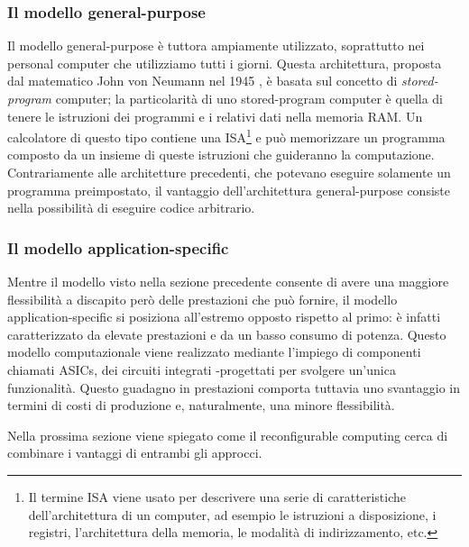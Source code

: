 \subsubsection{Il modello general-purpose}
Il modello general-purpose è tuttora ampiamente utilizzato, soprattutto nei personal
computer che utilizziamo tutti i giorni. Questa architettura, proposta dal matematico
John von Neumann nel 1945 \cite{First-Draft-Report-EDVAC}, è basata sul concetto di
\emph{stored-program} computer; la particolarità di uno stored-program computer è quella
di tenere le istruzioni dei programmi e i relativi dati nella memoria RAM. Un calcolatore di
questo tipo contiene una \ac{ISA}\footnote{Il termine \acl{ISA} viene usato per descrivere
una serie di caratteristiche dell'architettura di un computer, ad esempio le istruzioni
a disposizione, i registri, l'architettura della memoria, le modalità di indirizzamento, etc.}
e può memorizzare un programma composto da un insieme di queste istruzioni che guideranno
la computazione. Contrariamente alle architetture precedenti, che potevano eseguire
solamente un programma preimpostato, il vantaggio dell'architettura general-purpose consiste
nella possibilità di eseguire codice arbitrario.

\subsubsection{Il modello application-specific}
Mentre il modello visto nella sezione precedente consente di avere una maggiore
flessibilità a discapito però delle prestazioni che può fornire, il modello
application-specific si posiziona all'estremo opposto rispetto al primo: è infatti
caratterizzato da elevate prestazioni e da un basso consumo di potenza. Questo modello
computazionale viene realizzato mediante l'impiego di componenti chiamati \acp{ASIC},
dei circuiti integrati -progettati per svolgere un'unica funzionalità. Questo guadagno
in prestazioni comporta tuttavia uno svantaggio in termini di costi di produzione e,
naturalmente, una minore flessibilità.

Nella prossima sezione viene spiegato come il reconfigurable computing cerca di combinare
i vantaggi di entrambi gli approcci.


